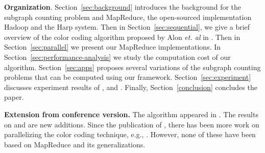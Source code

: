 \noindent
\textbf{Organization}.
Section~\ref{sec:background} introduces the background for the subgraph counting
problem and MapReduce, the open-sourced implementation Hadoop and the Harp
system. Then in Section~\ref{sec:sequential}, we give a brief overview of the
color coding algorithm proposed by Alon \emph{et. al} in
\cite{alon2008biomolecular}. Then in Section~\ref{sec:parallel} we present our
MapReduce implementations. In Section~\ref{sec:performance-analysis} we study
the computation cost of our algorithm. Section~\ref{sec:apps} proposes several
variations of the subgraph counting problems that can be computed using our
framework. Section~\ref{sec:experiment} discusses experiment results of
\sahad{}, \ensahad{} and \harpsahad{}. Finally, Section~\ref{conclusion}
concludes the paper.

\noindent
\textbf{Extension from conference version.} The \sahad{} algorithm appeared in 
\cite{zhao2012sahad}. The results on \ensahad{} and \harpsahad{} are new additions.
Since the publication of \cite{zhao2012sahad}, there has been more work on
parallelizing the color coding technique, e.g., \cite{slota2013fast, slota2015parallel}.
However, none of these have been based on MapReduce and its generalizations.



%
%



